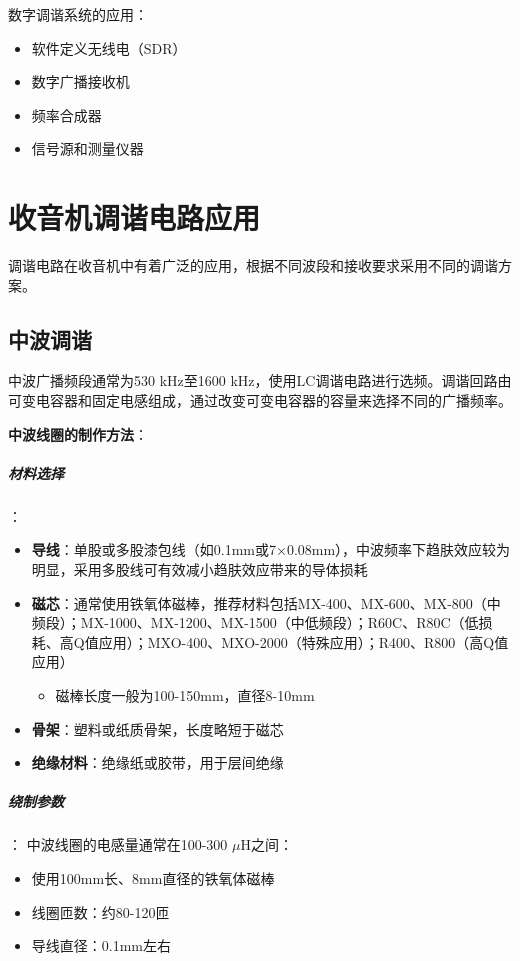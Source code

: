 数字调谐系统的应用：
\begin{itemize}
    \item 软件定义无线电（SDR）
    \item 数字广播接收机
    \item 频率合成器
    \item 信号源和测量仪器
\end{itemize}

\section{收音机调谐电路应用}
\label{sec:radio_tuning_applications}

调谐电路在收音机中有着广泛的应用，根据不同波段和接收要求采用不同的调谐方案。

\subsection{中波调谐}
\label{sec:mw_tuning_application}

中波广播频段通常为530 kHz至1600 kHz，使用LC调谐电路进行选频。调谐回路由可变电容器和固定电感组成，通过改变可变电容器的容量来选择不同的广播频率。

\textbf{中波线圈的制作方法}：

\subparagraph{材料选择}：
\begin{itemize}
  \item \textbf{导线}：单股或多股漆包线（如0.1mm或7×0.08mm），中波频率下趋肤效应较为明显，采用多股线可有效减小趋肤效应带来的导体损耗
  \item \textbf{磁芯}：通常使用铁氧体磁棒，推荐材料包括MX-400、MX-600、MX-800（中频段）；MX-1000、MX-1200、MX-1500（中低频段）；R60C、R80C（低损耗、高Q值应用）；MXO-400、MXO-2000（特殊应用）；R400、R800（高Q值应用）
    \begin{itemize}
        \item 磁棒长度一般为100-150mm，直径8-10mm
    \end{itemize}
  \item \textbf{骨架}：塑料或纸质骨架，长度略短于磁芯
  \item \textbf{绝缘材料}：绝缘纸或胶带，用于层间绝缘
\end{itemize}

\subparagraph{绕制参数}：
中波线圈的电感量通常在100-300 $\mu$H之间：
\begin{itemize}
    \item 使用100mm长、8mm直径的铁氧体磁棒
    \item 线圈匝数：约80-120匝
    \item 导线直径：0.1mm左右
\end{itemize}

